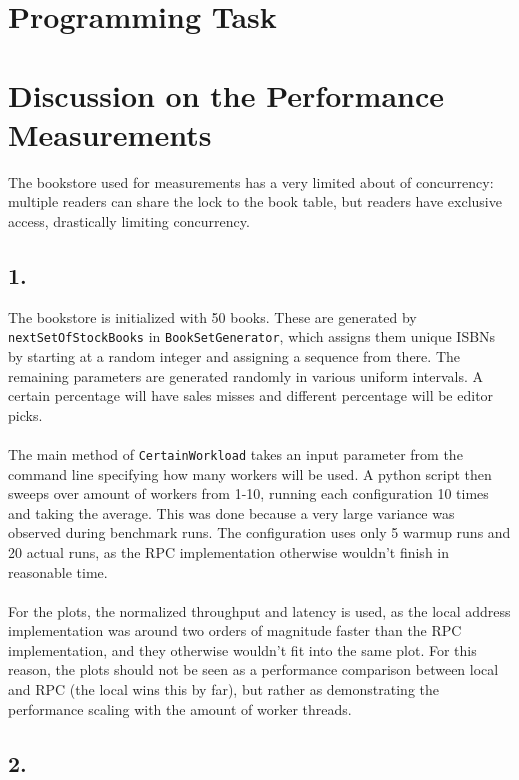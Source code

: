 \documentclass[12pt]{article}
\begin{document}
\section*{Programming Task}
\section*{Discussion on the Performance Measurements}

The bookstore used for measurements has a very limited about of concurrency: multiple readers can share the lock to the book table, but readers have exclusive access, drastically limiting concurrency.

\subsection*{1.}

The bookstore is initialized with 50 books. These are generated by \texttt{nextSetOfStockBooks} in \texttt{BookSetGenerator}, which assigns them unique ISBNs by starting at a random integer and assigning a sequence from there. The remaining parameters are generated randomly in various uniform intervals. A certain percentage will have sales misses and different percentage will be editor picks.
\\
\\
The main method of \verb|CertainWorkload| takes an input parameter from the command line specifying how many workers will be used. A python script then sweeps over amount of workers from 1-10, running each configuration 10 times and taking the average. This was done because a very large variance was observed during benchmark runs. The configuration uses only 5 warmup runs and 20 actual runs, as the RPC implementation otherwise wouldn't finish in reasonable time.
\\
\\
For the plots, the normalized throughput and latency is used, as the local address implementation was around two orders of magnitude faster than the RPC implementation, and they otherwise wouldn't fit into the same plot. For this reason, the plots should not be seen as a performance comparison between local and RPC (the local wins this by far), but rather as demonstrating the performance scaling with the amount of worker threads.

\subsection*{2.}
\end{document}

